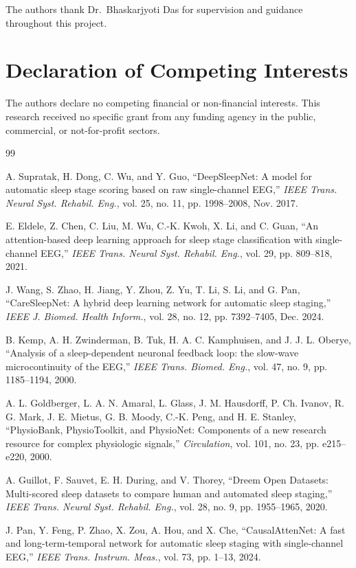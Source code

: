 \documentclass[conference]{IEEEtran}
\begin{document}
The authors thank Dr.\ Bhaskarjyoti Das for supervision and guidance throughout this project.

\section*{Declaration of Competing Interests}

The authors declare no competing financial or non-financial interests. This research received no
specific grant from any funding agency in the public, commercial, or not-for-profit sectors.

\begin{thebibliography}{99}

 A. Supratak, H. Dong, C. Wu, and Y. Guo, ``DeepSleepNet: A model for automatic
sleep stage scoring based on raw single-channel EEG,'' \emph{IEEE Trans. Neural Syst. Rehabil. Eng.},
vol. 25, no. 11, pp. 1998--2008, Nov. 2017.

 E. Eldele, Z. Chen, C. Liu, M. Wu, C.-K. Kwoh, X. Li, and C. Guan, ``An
attention-based deep learning approach for sleep stage classification with single-channel EEG,''
\emph{IEEE Trans. Neural Syst. Rehabil. Eng.}, vol. 29, pp. 809--818, 2021.

 J. Wang, S. Zhao, H. Jiang, Y. Zhou, Z. Yu, T. Li, S. Li, and G. Pan,
``CareSleepNet: A hybrid deep learning network for automatic sleep staging,'' \emph{IEEE J. Biomed.
Health Inform.}, vol. 28, no. 12, pp. 7392--7405, Dec. 2024.

 B. Kemp, A. H. Zwinderman, B. Tuk, H. A. C. Kamphuisen, and J. J. L. Oberye,
``Analysis of a sleep-dependent neuronal feedback loop: the slow-wave microcontinuity of the EEG,''
\emph{IEEE Trans. Biomed. Eng.}, vol. 47, no. 9, pp. 1185--1194, 2000.

 A. L. Goldberger, L. A. N. Amaral, L. Glass, J. M. Hausdorff, P. Ch. Ivanov,
R. G. Mark, J. E. Mietus, G. B. Moody, C.-K. Peng, and H. E. Stanley, ``PhysioBank, PhysioToolkit,
and PhysioNet: Components of a new research resource for complex physiologic signals,''
\emph{Circulation}, vol. 101, no. 23, pp. e215--e220, 2000.

 A. Guillot, F. Sauvet, E. H. During, and V. Thorey, ``Dreem Open Datasets: Multi-scored
sleep datasets to compare human and automated sleep staging,'' \emph{IEEE Trans. Neural Syst.
Rehabil. Eng.}, vol. 28, no. 9, pp. 1955--1965, 2020.

 J. Pan, Y. Feng, P. Zhao, X. Zou, A. Hou, and X. Che, ``CausalAttenNet: A
fast and long-term-temporal network for automatic sleep staging with single-channel EEG,''
\emph{IEEE Trans. Instrum. Meas.}, vol. 73, pp. 1--13, 2024.


\end{thebibliography}
\end{document}
